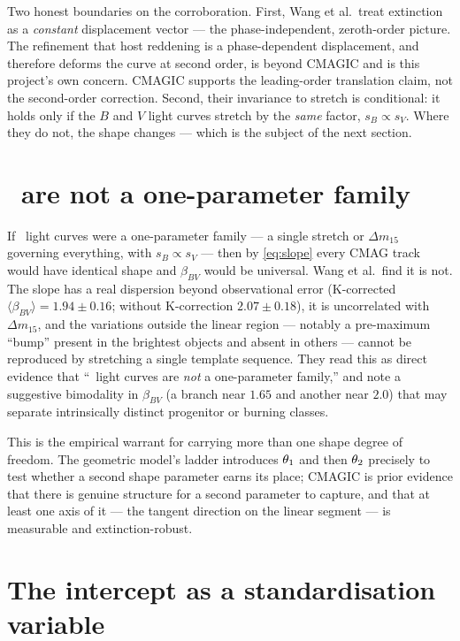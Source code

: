 \documentclass[11pt]{article}
\begin{document}
Two honest boundaries on the corroboration. First, Wang et al.\ treat extinction as
a \emph{constant} displacement vector --- the phase-independent, zeroth-order picture.
The refinement that host reddening is a phase-dependent displacement, and therefore
deforms the curve at second order, is beyond CMAGIC and is this project's own
concern. CMAGIC supports the leading-order translation claim, not the second-order
correction. Second, their invariance to stretch is conditional: it holds only if the
$B$ and $V$ light curves stretch by the \emph{same} factor, $s_{B} \propto s_{V}$.
Where they do not, the shape changes --- which is the subject of the next section.

\section{\sneia\ are not a one-parameter family}

If \snia\ light curves were a one-parameter family --- a single stretch or $\Delta
m_{15}$ governing everything, with $s_{B} \propto s_{V}$ --- then by \eqref{eq:slope}
every CMAG track would have identical shape and $\beta_{BV}$ would be universal. Wang
et al.\ find it is not. The slope has a real dispersion beyond observational error
(K-corrected $\langle\beta_{BV}\rangle = 1.94 \pm 0.16$; without K-correction
$2.07 \pm 0.18$), it is uncorrelated with $\Delta m_{15}$, and the variations outside
the linear region --- notably a pre-maximum ``bump'' present in the brightest objects
and absent in others --- cannot be reproduced by stretching a single template
sequence. They read this as direct evidence that ``\snia\ light curves are \emph{not}
a one-parameter family,'' and note a suggestive bimodality in $\beta_{BV}$
(a branch near $1.65$ and another near $2.0$) that may separate intrinsically
distinct progenitor or burning classes.

This is the empirical warrant for carrying more than one shape degree of freedom.
The geometric model's ladder introduces $\theta_{1}$ and then $\theta_{2}$ precisely to
test whether a second shape parameter earns its place; CMAGIC is prior evidence that
there is genuine structure for a second parameter to capture, and that at least one
axis of it --- the tangent direction on the linear segment --- is measurable and
extinction-robust.

\section{The intercept as a standardisation variable}
\end{document}
